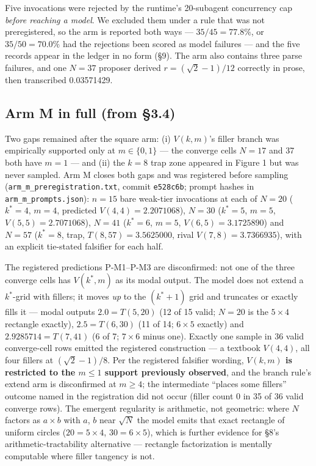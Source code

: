Five invocations were rejected by the runtime's 20-subagent concurrency cap
\emph{before reaching a model}. We excluded them under a rule that was not preregistered, so the arm
is reported both ways --- $35/45 = 77.8\%$, or $35/50 = 70.0\%$ had the rejections been scored as model
failures --- and the five records appear in the ledger in no form (\S9). The arm
also contains three parse failures, and one $N = 37$ proposer derived
$r = (\sqrt{2}-1)/12$ correctly in prose, then transcribed 0.03571429.

\subsection{Arm M in full (from \S3.4)}

Two gaps remained after the square arm: (i) $V(k, m)$'s filler branch
was empirically supported only at $m \in \{0, 1\}$ --- the converge cells $N = 17$ and 37 both have
$m = 1$ --- and (ii) the $k = 8$ trap zone appeared in Figure 1 but was never sampled. Arm M closes
both gaps and was registered before sampling (\texttt{arm\_m\_preregistration.txt}, commit
\texttt{e528c6b}; prompt hashes in \texttt{arm\_m\_prompts.json}): $n = 15$ bare weak-tier
invocations at each of $N = 20$ ($k^* = 4$, $m = 4$, predicted $V(4,4) = 2.2071068$), $N = 30$
($k^* = 5$, $m = 5$, $V(5,5) = 2.7071068$), $N = 41$ ($k^* = 6$, $m = 5$, $V(6,5) = 3.1725890$) and
$N = 57$ ($k^* = 8$, trap, $T(8,57) = 3.5625000$, rival $V(7,8) = 3.7366935$), with an explicit
tie-stated falsifier for each half.

The registered predictions P-M1--P-M3 are disconfirmed: not one of the three converge cells has
$V(k^*, m)$ as its modal output. The model does not extend a $k^*$-grid with fillers; it moves
\emph{up} to the $(k^*{+}1)$ grid and truncates or exactly fills it --- modal outputs
$2.0 = T(5,20)$ (12 of 15 valid; $N = 20$ is the $5 \times 4$ rectangle exactly), $2.5 = T(6,30)$
(11 of 14; $6 \times 5$ exactly) and $2.9285714 = T(7,41)$ (6 of 7; $7 \times 6$ minus one). Exactly one
sample in 36 valid converge-cell rows emitted the registered construction --- a textbook $V(4,4)$,
all four fillers at $(\sqrt{2}-1)/8$. Per the registered falsifier wording, \textbf{$V(k, m)$ is
restricted to the $m \le 1$ support previously observed}, and the branch rule's extend arm is
disconfirmed at $m \ge 4$; the intermediate ``places some fillers'' outcome named in the
registration did not occur (filler count 0 in 35 of 36 valid converge rows). The emergent
regularity is arithmetic, not geometric: where $N$ factors as $a \times b$ with $a$, $b$ near
$\sqrt{N}$ the model emits that exact rectangle of uniform circles ($20 = 5 \times 4$,
$30 = 6 \times 5$), which is further evidence for \S8's arithmetic-tractability alternative ---
rectangle factorization is mentally computable where filler tangency is not.


